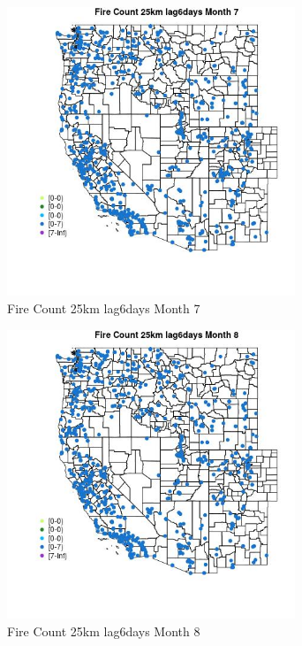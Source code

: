 \begin{figure} 
\centering  
\includegraphics[width=0.77\textwidth]{Code_Outputs/Report_ML_input_PM25_Step4_part_e_de_duplicated_aves_compiled_2019-05-21wNAs_MapObsMo7Fire_Count_25km_lag6days.jpg} 
\caption{\label{fig:Report_ML_input_PM25_Step4_part_e_de_duplicated_aves_compiled_2019-05-21wNAsMapObsMo7Fire_Count_25km_lag6days}Fire Count 25km lag6days Month 7} 
\end{figure} 
 

\begin{figure} 
\centering  
\includegraphics[width=0.77\textwidth]{Code_Outputs/Report_ML_input_PM25_Step4_part_e_de_duplicated_aves_compiled_2019-05-21wNAs_MapObsMo8Fire_Count_25km_lag6days.jpg} 
\caption{\label{fig:Report_ML_input_PM25_Step4_part_e_de_duplicated_aves_compiled_2019-05-21wNAsMapObsMo8Fire_Count_25km_lag6days}Fire Count 25km lag6days Month 8} 
\end{figure} 
 

